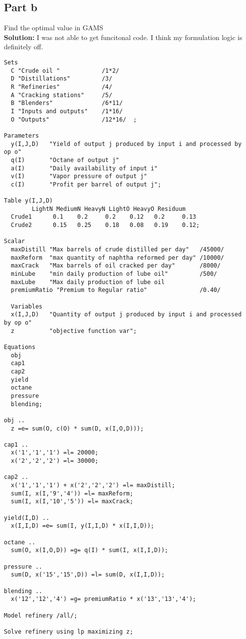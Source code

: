 \documentclass[11pt]{article}
\begin{document}
\subsection{Part b}
Find the optimal value in GAMS
\\
\textbf{Solution: } I was not able to get funcitonal code.
I think my formulation logic is definitely off.
\begin{verbatim}
Sets
  C "Crude oil "            /1*2/    
  D "Distillations"         /3/      
  R "Refineries"            /4/      
  A "Cracking stations"     /5/      
  B "Blenders"              /6*11/   
  I "Inputs and outputs"    /1*16/   
  O "Outputs"               /12*16/  ;

Parameters
  y(I,J,D)   "Yield of output j produced by input i and processed by op o"
  q(I)       "Octane of output j"
  a(I)       "Daily availability of input i"
  v(I)       "Vapor pressure of output j"
  c(I)       "Profit per barrel of output j";

Table y(I,J,D)
        LightN MediumN HeavyN LightO HeavyO Residuum
  Crude1      0.1    0.2     0.2    0.12   0.2     0.13
  Crude2      0.15   0.25    0.18   0.08   0.19    0.12;

Scalar
  maxDistill "Max barrels of crude distilled per day"   /45000/  
  maxReform  "max quantity of naphtha reformed per day" /10000/  
  maxCrack   "Max barrels of oil cracked per day"       /8000/   
  minLube    "min daily production of lube oil"         /500/    
  maxLube    "Max daily production of lube oil
  premiumRatio "Premium to Regular ratio"               /0.40/ 

  Variables
  x(I,J,D)   "Quantity of output j produced by input i and processed by op o"
  z          "objective function var";

Equations
  obj         
  cap1        
  cap2       
  yield      
  octane     
  pressure    
  blending;

obj ..
  z =e= sum(O, c(O) * sum(D, x(I,O,D)));

cap1 ..
  x('1','1','1') =l= 20000;
  x('2','2','2') =l= 30000;

cap2 ..
  x('1','1','1') + x('2','2','2') =l= maxDistill;
  sum(I, x(I,'9','4')) =l= maxReform;
  sum(I, x(I,'10','5')) =l= maxCrack;

yield(I,D) ..
  x(I,I,D) =e= sum(I, y(I,I,D) * x(I,I,D));

octane ..
  sum(O, x(I,O,D)) =g= q(I) * sum(I, x(I,I,D));

pressure ..
  sum(D, x('15','15',D)) =l= sum(D, x(I,I,D));

blending ..
  x('12','12','4') =g= premiumRatio * x('13','13','4');

Model refinery /all/;

Solve refinery using lp maximizing z;
\end{verbatim}
\end{document}

